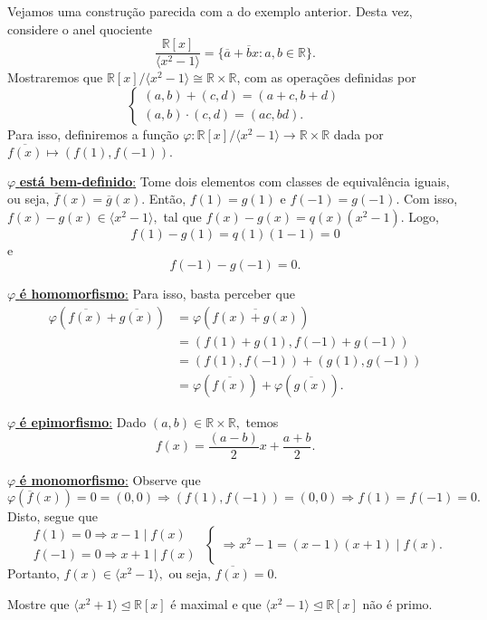 \documentclass[AlgebraII/algebraII_notes.tex]{subfiles}
\begin{document}
\begin{example}
	Vejamos uma construção parecida com a do exemplo anterior. Desta vez, considere o anel quociente
	\[
		\frac{\mathbb{R}[x]}{\langle x^{2}-1 \rangle} = \{\overline{a}+\overline{b}x:a, b\in \mathbb{R}\}.
	\]
	Mostraremos que \(\mathbb{R}[x]/\langle x^{2}-1 \rangle\cong{\mathbb{R}\times \mathbb{R}}\), com as operações definidas por
	\[
		\left\{\begin{array}{ll}
			(a, b) + (c, d) = (a + c, b + d) \\
			(a, b) \cdot (c, d) = (ac, bd).
		\end{array}\right.
	\]
	Para isso, definiremos a função \(\varphi :\mathbb{R}[x]/\langle x^{2}-1 \rangle\rightarrow \mathbb{R}\times \mathbb{R}\) dada por \(\overline{f(x)}\mapsto (f(1), f(-1)).\)

	\underline{ \(\varphi \)\textbf{ está bem-definido}:} Tome dois elementos com classes de equivalência iguais, ou seja,
	\(\overline{f}(x) = \overline{g}(x)\). Então, \(f(1) = g(1) \) e \(f(-1) = g(-1)\). Com isso,
	\(f(x) - g(x)\in \langle x^{2} - 1 \rangle,\) tal que \(f(x) - g(x) = q(x)(x^{2}-1)\). Logo,
	\[
		f(1) - g(1) = q(1)(1-1) = 0
	\]
	e
	\[
		f(-1)-g(-1) = 0.
	\]

	\underline{\(\varphi\) \textbf{ é homomorfismo}:} Para isso, basta perceber que
	\begin{align*}
		\varphi (\overline{f(x)} + \overline{g(x)}) & = \varphi (\overline{f(x)+g(x)})                         \\
		                                            & = (f(1) + g(1), f(-1)+g(-1))                             \\
		                                            & = (f(1), f(-1)) + (g(1), g(-1))                          \\
		                                            & = \varphi (\overline{f(x)}) + \varphi (\overline{g(x)}).
	\end{align*}

	\underline{\(\varphi \)\textbf{ é epimorfismo}:} Dado \((a, b)\in \mathbb{R}\times \mathbb{R},\) temos
	\[
		f(x) = \frac{(a-b)}{2}x + \frac{a+b}{2}.
	\]

	\underline{\(\varphi \)\textbf{ é monomorfismo}:} Observe que
	\[
		\varphi (\overline{f}(x)) = 0 = (0, 0) \Rightarrow (f(1), f(-1)) = (0, 0) \Rightarrow f(1) = f(-1) = 0.
	\]
	Disto, segue que
	\[
		\left.\begin{array}{ll}
			f(1) = 0 \Rightarrow x-1\mid f(x) \\
			f(-1) = 0 \Rightarrow x+1\mid f(x)
		\end{array}\right\{ \Rightarrow x^{2}-1 = (x-1)(x+1)\mid f(x).
	\]
	Portanto, \(f(x)\in \langle x^{2}-1 \rangle,\) ou seja, \(\overline{f(x)} = 0.\)
\end{example}
\begin{example}[Exercícios]
	Mostre que \(\langle x^{2} + 1 \rangle \trianglelefteq \mathbb{R}[x]\) é maximal e que \(\langle x^{2}-1 \rangle \trianglelefteq \mathbb{R}[x]\) não é primo.
\end{example}
\end{document}
